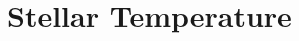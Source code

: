 \hypertarget{group___stellar_temperature}{}\section{Stellar Temperature}
\label{group___stellar_temperature}

